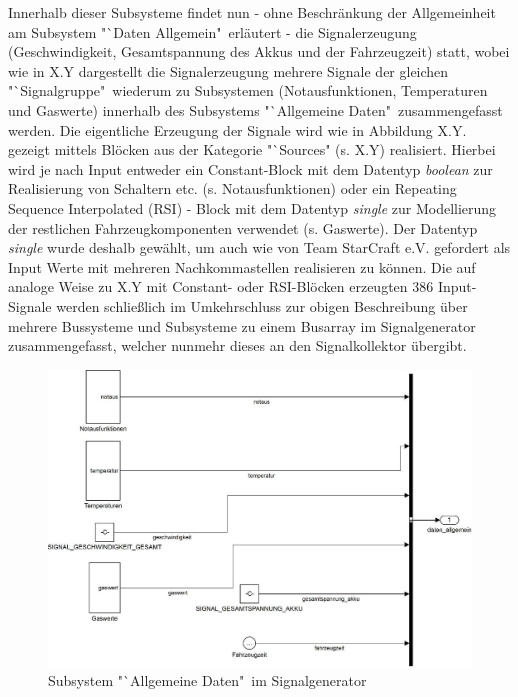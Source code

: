\documentclass[fontsize = 12pt, paper = a4]{scrreprt}
\begin{document}
Innerhalb dieser Subsysteme findet nun - ohne Beschränkung der Allgemeinheit am Subsystem "`Daten Allgemein"\ erläutert - die Signalerzeugung (Geschwindigkeit, Gesamtspannung des Akkus und der Fahrzeugzeit) statt, wobei wie in X.Y dargestellt die Signalerzeugung mehrere Signale der gleichen "`Signalgruppe"\ wiederum zu Subsystemen (Notausfunktionen, Temperaturen und Gaswerte)  innerhalb des Subsystems "`Allgemeine Daten"\ zusammengefasst werden. Die eigentliche Erzeugung der Signale wird wie in Abbildung X.Y. gezeigt mittels Blöcken aus der Kategorie "`Sources" (s. X.Y) realisiert. Hierbei wird je nach Input entweder ein Constant-Block mit dem Datentyp \textit{boolean} zur Realisierung von Schaltern etc. (s. Notausfunktionen) oder ein Repeating Sequence Interpolated (RSI) - Block mit dem Datentyp \textit{single} zur Modellierung der restlichen Fahrzeugkomponenten verwendet (s. Gaswerte). Der Datentyp \textit{single} wurde deshalb gewählt, um auch wie von Team StarCraft e.V. gefordert als Input Werte mit mehreren Nachkommastellen realisieren zu können. Die auf analoge Weise zu X.Y mit Constant- oder RSI-Blöcken erzeugten 386 Input-Signale werden schließlich im Umkehrschluss zur obigen Beschreibung über mehrere Bussysteme und Subsysteme zu einem Busarray im Signalgenerator zusammengefasst, welcher nunmehr dieses an den Signalkollektor übergibt.   




\begin{figure}[h]
\centering
\includegraphics[scale = 0.65]{suballgemein}
\caption{Subsystem "`Allgemeine Daten"\ im Signalgenerator}
\end{figure}
  
\end{document}

